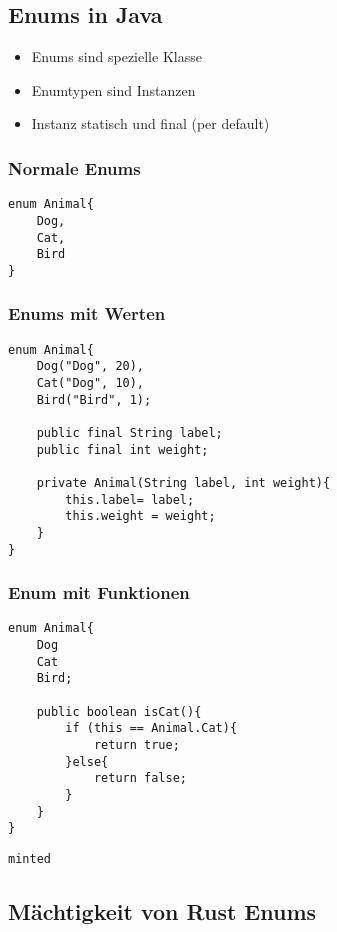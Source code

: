 \documentclass[a4paper, 1ppt]{article}
\begin{document}
\subsection{Enums in Java}
\begin{itemize}
	\item Enums sind spezielle Klasse
	\item Enumtypen sind Instanzen
	\item Instanz statisch und final (per default)
\end{itemize}
\subsubsection{Normale Enums}
\begin{verbatim}
enum Animal{
    Dog,
    Cat,
    Bird
}
\end{verbatim}
\subsubsection{Enums mit Werten}
\begin{verbatim}
enum Animal{
    Dog("Dog", 20),
    Cat("Dog", 10),
    Bird("Bird", 1);

    public final String label;
    public final int weight;

    private Animal(String label, int weight){
        this.label= label;
        this.weight = weight;
    }
}
\end{verbatim}
\subsubsection{Enum mit Funktionen}
\begin{verbatim}
enum Animal{
    Dog
    Cat
    Bird;

    public boolean isCat(){
        if (this == Animal.Cat){
            return true;
        }else{
            return false;
        }
    }
}
\end{verbatim}
\begin{verbatim}
minted\end{verbatim}
\subsection{Mächtigkeit von Rust Enums}
\end{document}
